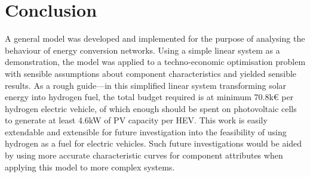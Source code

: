 \documentclass[]{article}
\numberwithin{equation}{section}
\theoremstyle{plain} %
\theoremstyle{definition}
\theoremstyle{remark}
\begin{document}
\newpage
\section{Conclusion}
A general model was developed and implemented for the purpose of
analysing the behaviour of energy conversion networks.
Using a simple linear system as a demonstration, the model was applied to a techno-economic optimisation problem
with sensible assumptions about component characteristics and yielded sensible results.
As a rough guide---in this simplified linear system transforming solar energy into
hydrogen fuel, the total budget required is at minimum 70.8k\euro{} per hydrogen electric vehicle, of which
enough should be spent on photovoltaic cells to generate at least 4.6kW of PV capacity per HEV.
This work is easily extendable and extensible for future investigation into the feasibility of using hydrogen as a fuel for electric vehicles.
Such future investigations would be aided by using more accurate characteristic curves for component attributes
when applying this model to more complex systems.

\end{document}
